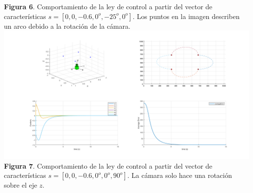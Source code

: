 \documentclass{article}
\begin{document}
\begin{center}
	{\footnotesize \textbf{Figura 6}. Comportamiento de la ley de control a partir del vector de caracter\'isticas $s=[0,0,-0.6,0^o,-25^o,0^o]$. Los puntos en la imagen describen un arco debido a la rotaci\'on de la c\'amara.}\\
	\includegraphics[scale=0.3]{extra_6.png}\\
	{\footnotesize \textbf{Figura 7}. Comportamiento de la ley de control a partir del vector de caracter\'isticas $s=[0,0,-0.6,0^o,0^o,90^o]$. La c\'amara solo hace una rotaci\'on sobre el eje $z$.}\\
	\end{center}
	
\end{document}
